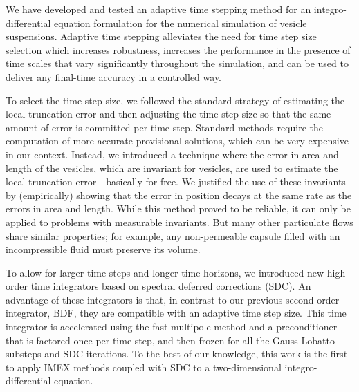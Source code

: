 We have developed and tested an adaptive time stepping method for an
integro-differential equation formulation for the numerical simulation
of vesicle suspensions.  Adaptive time stepping alleviates the need for
time step size selection which increases robustness, increases the
performance in the presence of time scales that vary significantly
throughout the simulation, and can be used to deliver any final-time
accuracy in a controlled way.

To select the time step size, we followed the standard strategy of
estimating the local truncation error and then adjusting the time step
size so that the same amount of error is committed per time step.
Standard methods require the computation of more accurate provisional
solutions, which can be very expensive in our context. Instead, we
introduced a technique where the error in area and length of the
vesicles, which are invariant for vesicles, are used to estimate the
local truncation error---basically for free.  We justified the use of
these invariants by (empirically) showing that the error in position
decays at the same rate as the errors in area and length.  While this
method proved to be reliable, it can only be applied to problems with
measurable invariants. But many other particulate flows share similar
properties; for example, any non-permeable capsule filled with an
incompressible fluid must preserve its volume.

To allow for larger time steps and longer time horizons, we
introduced new high-order time integrators based on spectral deferred
corrections (SDC).  An advantage of these integrators is that, in
contrast to our previous second-order integrator, BDF, they are
compatible with an adaptive time step size.  This time integrator is
accelerated using the fast multipole method and a preconditioner that
is factored once per time step, and then frozen for all the
Gauss-Lobatto substeps and SDC iterations.  To the best of our
knowledge, this work is the first to apply IMEX methods coupled with
SDC to a two-dimensional integro-differential equation.

